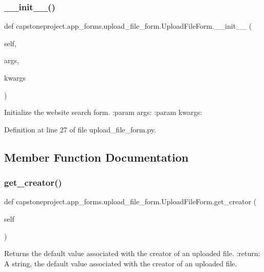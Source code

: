 \subsubsection{\texorpdfstring{\+\_\+\+\_\+init\+\_\+\+\_\+()}{\_\_init\_\_()}}
{\footnotesize\ttfamily def capstoneproject.\+app\+\_\+forms.\+upload\+\_\+file\+\_\+form.\+Upload\+File\+Form.\+\_\+\+\_\+init\+\_\+\+\_\+ (\begin{DoxyParamCaption}\item[{}]{self,  }\item[{}]{args,  }\item[{}]{kwargs }\end{DoxyParamCaption})}

\begin{DoxyVerb}Initialize the website search form.
:param args:
:param kwargs:
\end{DoxyVerb}
 

Definition at line 27 of file upload\+\_\+file\+\_\+form.\+py.



\subsection{Member Function Documentation}
\mbox{\label{classcapstoneproject_1_1app__forms_1_1upload__file__form_1_1_upload_file_form_a8d73da0210530745427708acffb55b34}} 
\subsubsection{\texorpdfstring{get\+\_\+creator()}{get\_creator()}}
{\footnotesize\ttfamily def capstoneproject.\+app\+\_\+forms.\+upload\+\_\+file\+\_\+form.\+Upload\+File\+Form.\+get\+\_\+creator (\begin{DoxyParamCaption}\item[{}]{self }\end{DoxyParamCaption})}

\begin{DoxyVerb}Returns the default value associated with the creator of an uploaded file.
:return: A string, the default value associated with the creator of an uploaded file.
\end{DoxyVerb}
 

